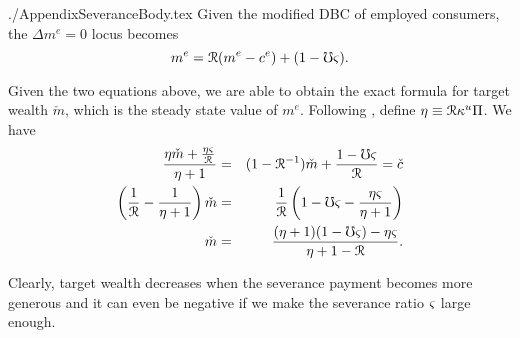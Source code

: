 \documentclass{\econtex}
\begin{document}
\begin{verbatimwrite}{./AppendixSeveranceBody.tex}
Given the modified DBC of employed consumers, the $\Delta m^e=0$ locus becomes
\begin{equation}
m^e=\mathcal{R}(m^e-c^e)+(1-\mho\varsigma).
\end{equation}

Given the two equations above, we are able to obtain the exact formula for target wealth $\check{m}$, which is the steady state value of $m^e$. Following \cite{ctDiscrete}, define $\eta \equiv \mathcal{R} \kappa^{u} \Pi$. We have
\begin{eqnarray}
\frac{\eta\check{m}+\frac{\eta\varsigma}{\mathcal{R}}}{\eta+1}&=&(1-\mathcal{R}^{-1})\check{m}+\frac{1-\mho\varsigma}{\mathcal{R}}=\check{c}\nonumber\\
\left(\frac{1}{\mathcal{R}}-\frac{1}{\eta+1}\right)\check{m} &=& \frac{1}{\mathcal{R}}\left(1-\mho\varsigma-\frac{\eta\varsigma}{\eta+1}\right)\nonumber\\
\check{m}&=& \frac{(\eta+1)(1-\mho\varsigma)-\eta\varsigma}{\eta+1-\mathcal{R}}.
\end{eqnarray}

Clearly, target wealth decreases when the severance payment becomes more generous and it can even be negative if we make the severance ratio $\varsigma$ large enough.
\end{verbatimwrite}



\end{document}
